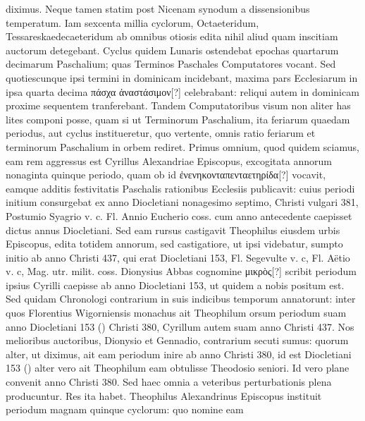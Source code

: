 diximus.
Neque tamen statim post Nicenam synodum a dissensionibus
temperatum.
Iam sexcenta millia cyclorum, Octaeteridum,
Tessareskaedecaeteridum ab omnibus otiosis edita nihil aliud quam
inscitiam auctorum detegebant.
Cyclus quidem Lunaris ostendebat
epochas quartarum decimarum Paschalium; quas Terminos Paschales
Computatores vocant.
Sed quotiescunque ipsi termini in dominicam
incidebant, 
 maxima pars Ecclesiarum in ipsa quarta decima
\textgreek{πάσχα ἀναστάσιμον[?]} celebrabant:
 reliqui autem in dominicam proxime
sequentem tranferebant.
Tandem
Computatoribus visum non aliter has lites componi posse,
quam si ut Terminorum Paschalium,
ita feriarum quaedam periodus, aut cyclus
institueretur, quo vertente, omnis
ratio feriarum et terminorum Paschalium
in orbem rediret.
Primus
omnium, quod quidem sciamus, eam
rem aggressus est Cyrillus Alexandriae
Episcopus, excogitata annorum
nonaginta quinque periodo, quam ob
id \textgreek{ἐνενηκονταπενταετηρίδα[?]} vocavit, eamque
additis festivitatis Paschalis rationibus
Ecclesiis publicavit: cuius periodi
initium consurgebat ex anno
Diocletiani nonagesimo septimo, Christi
vulgari 381, Postumio Syagrio v. c. %
Fl. Annio Eucherio coss. cum anno antecedente caepisset dictus
annus Diocletiani.
%
Sed eam rursus castigavit Theophilus eiusdem urbis
Episcopus, edita totidem annorum, sed castigatiore, ut ipsi videbatur,
sumpto initio ab anno Christi 437, qui erat Diocletiani
153, Fl. Segevulte v. c, Fl. Aëtio v. c, Mag. utr. milit. coss. %
Dionysius
Abbas cognomine \textgreek{μικρὸς[?]} scribit periodum %
 ipsius Cyrilli caepisse
ab anno Diocletiani 153, ut quidem a nobis positum est.
Sed quidam
Chronologi contrarium in suis indicibus temporum annatorunt:
inter quos Florentius Wigorniensis monachus ait Theophilum
orsum periodum suam anno Diocletiani 153 () Christi
380, Cyrillum autem suam anno Christi 437.
Nos melioribus
auctoribus, Dionysio et Gennadio, contrarium secuti sumus: quorum
alter, ut diximus, ait eam periodum inire ab anno Christi 380,
id est Diocletiani 153 () alter vero ait Theophilum eam obtulisse
Theodosio seniori.
Id vero plane convenit anno Christi 380.
Sed haec omnia a veteribus perturbationis plena producuntur.
Res ita
habet.
Theophilus Alexandrinus Episcopus instituit periodum magnam
quinque cyclorum: quo nomine eam
